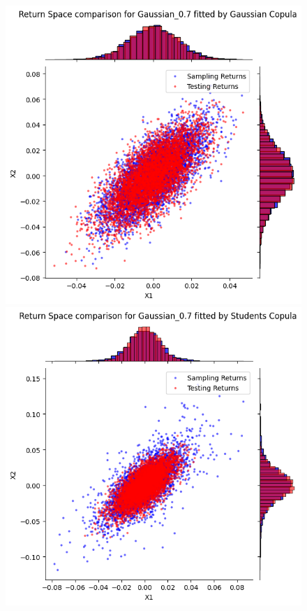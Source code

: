 \documentclass[%
a4paper,							
11pt,								
bibliography=totoc,						
abstracton=true					
]
{scrartcl}
\theoremstyle{plain}
\theoremstyle{definition}
\theoremstyle{remark}
\newcommand{\1}{\mathbbm{1}}
\begin{document}
\begin{figure}[H]
    \centering
    \begin{minipage}{0.4\textwidth}
        \centering
        \includegraphics[width=\textwidth]{5ResultsDiscussion/pictures/PortfolioTest/ResultPortfolio2Gauss.png}
    \end{minipage}
    \hfill
    \begin{minipage}{0.4\textwidth}
        \centering
        \includegraphics[width=\textwidth]{5ResultsDiscussion/pictures/PortfolioTest/ResultPortfolio2Students.png}

\end{minipage}
\end{figure}
\end{document}

